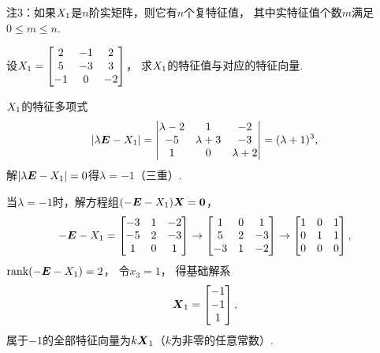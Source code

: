 注3：如果\(X_1\)是\(n\)阶实矩阵，则它有\(n\)个复特征值，
其中实特征值个数\(m\)满足\(0 \leq m \leq n\).

\begin{example}
设\(X_1 = \begin{bmatrix} 2 & -1 & 2 \\ 5 & -3 & 3 \\ -1 & 0 & -2 \end{bmatrix}\)，
求\(X_1\)的特征值与对应的特征向量.
\begin{solution}
\(X_1\)的特征多项式\[
	\abs{\lambda\boldsymbol{E}-X_1}
	= \begin{vmatrix} \lambda-2 & 1 & -2 \\ -5 & \lambda+3 & -3 \\ 1 & 0 & \lambda+2 \end{vmatrix}
	= (\lambda+1)^3,
\]
解\(\abs{\lambda\boldsymbol{E}-X_1}=0\)得\(\lambda=-1\)（三重）.

当\(\lambda=-1\)时，解方程组\((-\boldsymbol{E}-X_1)\boldsymbol{X}=\boldsymbol{0}\)，\[
	-\boldsymbol{E}-X_1 = \begin{bmatrix} -3 & 1 & -2 \\ -5 & 2 & -3 \\ 1 & 0 & 1 \end{bmatrix}
	\to \begin{bmatrix} 1 & 0 & 1 \\ 5 & 2 & -3 \\ -3 & 1 & -2 \end{bmatrix}
	\to \begin{bmatrix} 1 & 0 & 1 \\ 0 & 1 & 1 \\ 0 & 0 & 0 \end{bmatrix},
\]
\(\rank(-\boldsymbol{E}-X_1)=2\)，
令\(x_3=1\)，
得基础解系\[
	\boldsymbol{X}_1=\begin{bmatrix} -1 \\ -1 \\ 1 \end{bmatrix},
\]
属于\(-1\)的全部特征向量为\(k\boldsymbol{X}_1\)（\(k\)为非零的任意常数）.
\end{solution}
\end{example}

